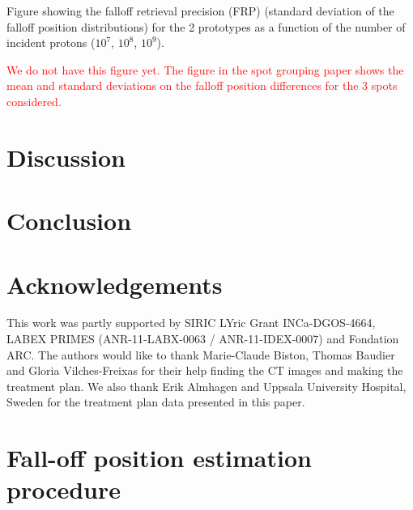 \documentclass[a4paper,english]{article}
\begin{document}
Figure showing the falloff retrieval precision (FRP) (standard deviation of the falloff position distributions) for the 2 prototypes as a function of the number of incident protons ($10^7$, $10^8$, $10^9$).

\textcolor{red}{We do not have this figure yet. The figure in the spot grouping paper shows the mean and standard deviations on the falloff position differences for the 3 spots considered. }

\section{Discussion}


\section{Conclusion}


\section{Acknowledgements}

This work was partly supported by SIRIC LYric Grant INCa-DGOS-4664, LABEX PRIMES (ANR-11-LABX-0063 / ANR-11-IDEX-0007) and Fondation ARC. The authors would like to thank Marie-Claude Biston, Thomas Baudier and Gloria Vilches-Freixas for their help finding the CT images and making the treatment plan. We also thank Erik Almhagen and Uppsala University Hospital, Sweden for the treatment plan data presented in this paper.

\newpage

\appendix
% 

\section{Fall-off position estimation procedure}\label{sec:fopproc}
\end{document}
